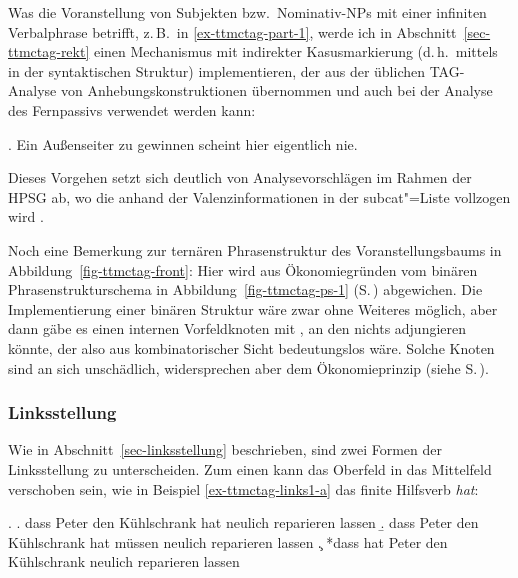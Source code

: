 Was die Voranstellung von Subjekten bzw.\ Nominativ-NPs mit einer infiniten Verbalphrase betrifft, z.\,B.\ in \ref{ex-ttmctag-part-1}, werde ich in Abschnitt~\ref{sec-ttmctag-rekt} einen Mechanismus mit indirekter Kasusmarkierung (d.\,h.\ mittels  in der syntaktischen Struktur) implementieren, der aus der üblichen TAG-Analyse von Anhebungskonstruktionen \citep[Chapter~9]{xtag:01} übernommen und auch bei der Analyse des Fernpassivs verwendet werden kann:    

\ex. \label{ex-ttmctag-part-1} Ein Au\ss enseiter zu gewinnen scheint hier eigentlich nie. \\ 
\citep[(265)]{Meurers:99}

Dieses Vorgehen setzt sich deutlich von Analysevorschlägen im Rahmen der HPSG ab, wo die  anhand der Valenzinformationen in der {\sc subcat}"=Liste vollzogen wird \citep{Heinz:Matiasek:94,Meurers:99,Mueller:01}. 
 
Noch eine Bemerkung zur ternären Phrasenstruktur des Voranstellungsbaums in Abbildung~\ref{fig-ttmctag-front}: Hier wird aus Ökonomiegründen vom binären Phrasenstrukturschema in Abbildung~\ref{fig-ttmctag-ps-1} (S.\,\pageref{fig-ttmctag-ps-1}) abgewichen. Die Implementierung einer binären Struktur wäre zwar ohne Weiteres möglich, aber dann gäbe es einen internen Vorfeldknoten mit , an den nichts adjungieren könnte, der also aus kombinatorischer Sicht bedeutungslos wäre. Solche Knoten sind an sich unschädlich, widersprechen aber dem Ökonomieprinzip (siehe S.\,\pageref{ex-oekonomieprinzip-tag}). 

\subsubsection*{Linksstellung}

Wie in Abschnitt~\ref{sec-linksstellung} beschrieben, sind zwei Formen der Linksstellung zu unterscheiden. Zum einen kann das Oberfeld in das Mittelfeld verschoben sein, wie in Beispiel \ref{ex-ttmctag-links1-a} das finite Hilfsverb {\it hat}:

\ex. \label{ex-ttmctag-links1}
\a. dass Peter den Kühlschrank hat neulich reparieren lassen \label{ex-ttmctag-links1-a}
\b. dass Peter den Kühlschrank hat müssen neulich reparieren lassen \label{ex-ttmctag-links1-b}
\c. *dass hat Peter den Kühlschrank neulich reparieren lassen \label{ex-ttmctag-links1-c}

